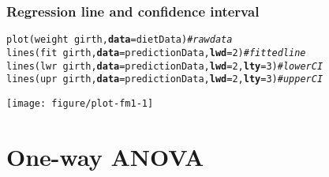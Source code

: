 \documentclass[color=usenames,dvipsnames]{beamer}\usepackage[]{graphicx}\usepackage[]{color}
\makeatletter
\newcommand{\hlnum}[1]{\textcolor[rgb]{0.69,0.494,0}{#1}}%
\newcommand{\hlcom}[1]{\textcolor[rgb]{0.514,0.506,0.514}{\textit{#1}}}%
\newcommand{\hlopt}[1]{\textcolor[rgb]{0,0,0}{#1}}%
\newcommand{\hlstd}[1]{\textcolor[rgb]{0,0,0}{#1}}%
\newcommand{\hlkwc}[1]{\textcolor[rgb]{0,0,0}{\textbf{#1}}}%
\newcommand{\hlkwd}[1]{\textcolor[rgb]{0.004,0.004,0.506}{#1}}%
\newenvironment{kframe}{%
 \def\at@end@of@kframe{}%
 \ifinner\ifhmode%
  \def\at@end@of@kframe{\end{minipage}}%
  \begin{minipage}{\columnwidth}%
 \fi\fi%
 \def\FrameCommand##1{\hskip\@totalleftmargin \hskip-\fboxsep
 \colorbox{shadecolor}{##1}\hskip-\fboxsep
     \hskip-\linewidth \hskip-\@totalleftmargin \hskip\columnwidth}%
 \MakeFramed {\advance\hsize-\width
   \@totalleftmargin\z@ \linewidth\hsize
   \@setminipage}}%
 {\par\unskip\endMakeFramed%
 \at@end@of@kframe}
\newenvironment{knitrout}{}{} %
\makeatother
\begin{document}
\begin{frame}[fragile]
  \frametitle{Regression line and confidence interval}
  \scriptsize
\begin{knitrout}\scriptsize
{}\color{fgcolor}\begin{kframe}
\begin{alltt}
\hlkwd{plot}\hlstd{(weight} \hlopt{~} \hlstd{girth,} \hlkwc{data}\hlstd{=dietData)}                   \hlcom{# raw data}
\hlkwd{lines}\hlstd{(fit} \hlopt{~} \hlstd{girth,} \hlkwc{data}\hlstd{=predictionData,} \hlkwc{lwd}\hlstd{=}\hlnum{2}\hlstd{)}        \hlcom{# fitted line}
\hlkwd{lines}\hlstd{(lwr} \hlopt{~} \hlstd{girth,} \hlkwc{data}\hlstd{=predictionData,} \hlkwc{lwd}\hlstd{=}\hlnum{2}\hlstd{,} \hlkwc{lty}\hlstd{=}\hlnum{3}\hlstd{)} \hlcom{# lower CI}
\hlkwd{lines}\hlstd{(upr} \hlopt{~} \hlstd{girth,} \hlkwc{data}\hlstd{=predictionData,} \hlkwc{lwd}\hlstd{=}\hlnum{2}\hlstd{,} \hlkwc{lty}\hlstd{=}\hlnum{3}\hlstd{)} \hlcom{# upper CI}
\end{alltt}
\end{kframe}
\end{knitrout}
  \vspace{-9mm}
  \begin{center}
    \texttt{[image: figure/plot-fm1-1]}
  \end{center}
\end{frame}



\section{One-way ANOVA}
\end{document}

